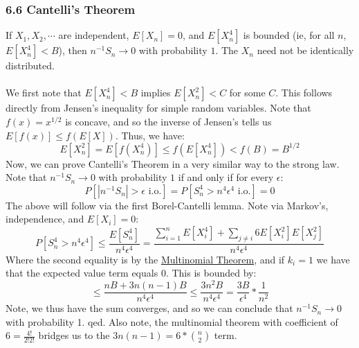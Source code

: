 \documentclass[12pt,a4paper]{article}
\newcommand{\1}[1]{\mathbbm{1}\left\{ #1 \right\}}
\newcommand{\io}{\text{i.o.}}
\begin{document}
\subsubsection{6.6 Cantelli's Theorem} If $X_1, X_2, \cdots$ are independent, $E[X_n] = 0$, and $E[X_n^4]$ is bounded (ie, for all $n$, $E[X_n^4] < B$), then $n^{-1}S_n \to 0$ with probability $1$. The $X_n$ need not be identically distributed. 
\\\\
We first note that $E[X_n^4] < B$ implies $E[X_n^2] < C$ for some $C$. This follows directly from Jensen's inequality for simple random variables. Note that $f(x) = x^{1/2}$ is concave, and so the inverse of Jensen's tells us $E[f(x)] \leq f(E[X])$. Thus, we have:
$$
	E[X_n^2] = E[f(X_n^4)] \leq f(E[X_n^4]) < f(B) = B^{1/2}
$$
Now, we can prove Cantelli's Theorem in a very similar way to the strong law. Note that $n^{-1}S_n \to 0$ with probability $1$ if and only if for every $\epsilon$:
$$
	P[|n^{-1}S_n| > \epsilon \,\, \io] = P[S_n^4 > n^4\epsilon^4 \,\, \io] = 0
$$
The above will follow via the first Borel-Cantelli lemma. Note via Markov's, independence, and $E[X_i] = 0$:
$$
	P[S_n^4 > n^4\epsilon^4] \leq \frac{E[S_n^4]}{n^4\epsilon^4} =
	\frac{\sum_{i=1}^n E[X_i^4] + \sum_{j \neq i} 6 E[X_i^2]E[X_j^2]}{n^4\epsilon^4}
$$
Where the second equality is by the \href{https://en.wikipedia.org/wiki/Multinomial_theorem}{Multinomial Theorem}, and if $k_i = 1$ we have that the expected value term equals $0$. This is bounded by:
$$
	\leq \frac{nB + 3n(n-1)B}{n^4\epsilon^4} \leq \frac{3n^2B}{n^4\epsilon^4} = \frac{3B}{\epsilon^4} * \frac{1}{n^2}
$$
Note, we thus have the sum converges, and so we can conclude that $n^{-1}S_n \to 0$ with probability 1. qed. Also note, the multinomial theorem with coefficient of $6 = \frac{4!}{2!2!}$ bridges us to the $3n(n-1) = 6 * {n \choose 2}$ term.
\end{document}
